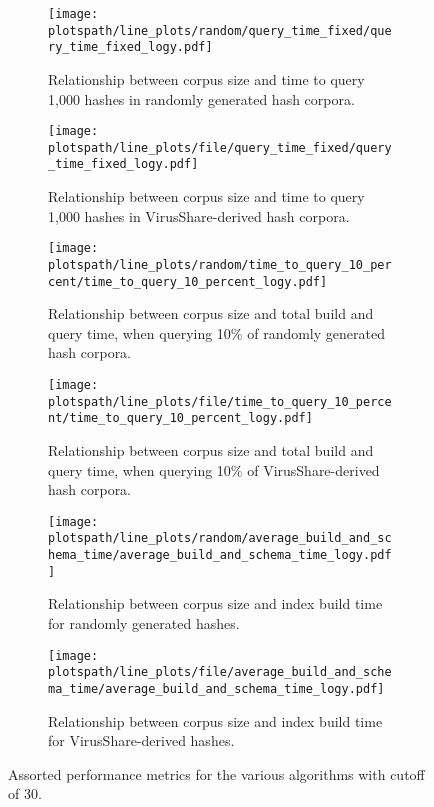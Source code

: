 \documentclass[5p,final]{elsarticle}
\newcommand{\plotspath}{paper-dependencies/latex-dependencies/plots}
\begin{document}
\begin{figure*}
	\centering

	\begin{subfigure}[b]{0.97\columnwidth}
		\centering
		\texttt{[image: \\plotspath/line\_plots/random/query\_time\_fixed/query\_time\_fixed\_logy.pdf]}
		\caption{Relationship between corpus size
			and time to query 1,000
		hashes in randomly generated hash corpora.}
		\label{fig:random_corpus_vs_total_time}
	\end{subfigure}
	\hfill
	\begin{subfigure}[b]{0.97\columnwidth}
		\centering
		\texttt{[image: \\plotspath/line\_plots/file/query\_time\_fixed/query\_time\_fixed\_logy.pdf]}
		\caption{Relationship between corpus size
			and time to query 1,000
		hashes in VirusShare-derived hash corpora.}
		\label{fig:file_corpus_vs_total_time}
	\end{subfigure}
	\vspace{1em}

	\begin{subfigure}[b]{0.97\columnwidth}
		\centering
		\texttt{[image: \\plotspath/line\_plots/random/time\_to\_query\_10\_percent/time\_to\_query\_10\_percent\_logy.pdf]}
		\caption{Relationship between corpus size
			and total build and
		query time, when querying 10\% of randomly generated hash corpora.}
		\label{fig:random_corpus_vs_query_time}
	\end{subfigure}
	\hfill
	\begin{subfigure}[b]{0.97\columnwidth}
		\centering
		\texttt{[image: \\plotspath/line\_plots/file/time\_to\_query\_10\_percent/time\_to\_query\_10\_percent\_logy.pdf]}
		\caption{Relationship between corpus size
			and total build and
		query time, when querying 10\% of VirusShare-derived hash corpora.}
		\label{fig:file_corpus_vs_query_time}
	\end{subfigure}

	\vspace{1em}

	\begin{subfigure}[b]{0.97\columnwidth}
		\centering
		\texttt{[image: \\plotspath/line\_plots/random/average\_build\_and\_schema\_time/average\_build\_and\_schema\_time\_logy.pdf]}
		\caption{Relationship between corpus size and index build time for
		randomly generated hashes.}
		\label{fig:build_time_random}
	\end{subfigure}
	\hfill
	\begin{subfigure}[b]{0.97\columnwidth}
		\centering
		\texttt{[image: \\plotspath/line\_plots/file/average\_build\_and\_schema\_time/average\_build\_and\_schema\_time\_logy.pdf]}
		\caption{Relationship between corpus size and index build time for
		VirusShare-derived hashes.}
		\label{fig:build_time_file}
	\end{subfigure}

	\vspace{1em}

	\caption{Assorted performance metrics for the various algorithms
	with cutoff of 30.}
	\label{fig:comparison_1}
\end{figure*}
\end{document}
